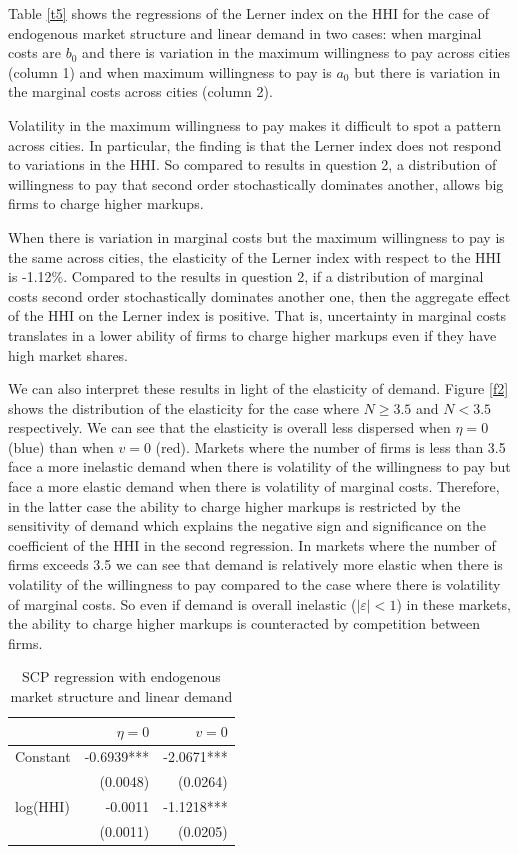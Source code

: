 \documentclass[11pt,english]{article}
\begin{document}
Table \eqref{t5} shows the regressions of the Lerner index on the HHI for the case of endogenous market structure and linear demand in two cases: when marginal costs are $b_{0}$ and there is variation in the maximum willingness to pay across cities (column 1) and when maximum willingness to pay is $a_{0}$ but there is variation in the marginal costs across cities (column 2). 

Volatility in the maximum willingness to pay makes it difficult to spot a pattern across cities. In particular, the finding is that the Lerner index does not respond to variations in the HHI. So compared to results in question 2, a distribution of willingness to pay that second order stochastically dominates another, allows big firms to charge higher markups. 

When there is variation in marginal costs but the maximum willingness to pay is the same across cities, the elasticity of the Lerner index with respect to the HHI is -1.12\%. Compared to the results in question 2, if a distribution of marginal costs second order stochastically dominates another one, then the aggregate effect of the HHI on the Lerner index is positive. That is, uncertainty in marginal costs translates in a lower ability of firms to charge higher markups even if they have high market shares.

We can also interpret these results in light of the elasticity of demand. Figure \eqref{f2}  shows the distribution of the elasticity for the case where $N\geq3.5$ and $N<3.5$ respectively. We can see that the elasticity is overall less dispersed when $\eta=0$ (blue)  than when $v=0$ (red). Markets where the number of firms is less than 3.5 face a more inelastic demand when there is volatility of the willingness to pay but face a more elastic demand when there is volatility of marginal costs. Therefore, in the latter case the ability to charge higher markups is restricted by the sensitivity of demand which explains the negative sign and significance on the coefficient of the HHI in the second regression. In markets where the number of firms exceeds 3.5 we can see that demand is relatively more elastic when there is volatility of the willingness to pay compared to the case where there is volatility of marginal costs. So even if demand is overall inelastic ($|\varepsilon|<1$) in these markets, the ability to charge higher markups is counteracted by competition between firms.  

\begin{table}[H]
  \centering
  \caption{SCP regression with endogenous market structure and linear demand}
    \begin{tabular}{lrr}
    \hline
          & $\eta=0$ & $v=0$ \\
    \hline
    Constant & -0.6939*** & -2.0671*** \\
        & (0.0048) & (0.0264) \\
    log(HHI) & -0.0011 & -1.1218*** \\
        & (0.0011) & (0.0205) \\
    \hline
    \end{tabular}%
  \label{t5}%
\end{table}
\end{document}
